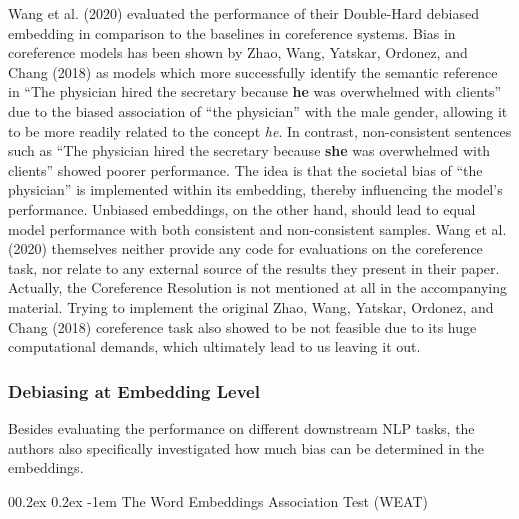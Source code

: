 \documentclass[
  english,
  man,floatsintext]{apa6}
\makeatletter
\let\oldparagraph\paragraph
\renewcommand{\paragraph}[1]{\oldparagraph{#1}\mbox{}}
\renewcommand{\paragraph}{\@startsection{paragraph}{4}{\parindent}%
  {0\baselineskip \@plus 0.2ex \@minus 0.2ex}%
  {-1em}%
  {\normalfont\normalsize\bfseries\itshape\typesectitle}}
\makeatother
\begin{document}
Wang et al. (2020) evaluated the performance of their Double-Hard debiased embedding in comparison to the baselines in coreference systems. Bias in coreference models has been shown by Zhao, Wang, Yatskar, Ordonez, and Chang (2018) as models which more successfully identify the semantic reference in ``The physician hired the secretary because \textbf{he} was overwhelmed with clients'' due to the biased association of ``the physician'' with the male gender, allowing it to be more readily related to the concept \emph{he}. In contrast, non-consistent sentences such as ``The physician hired the secretary because \textbf{she} was overwhelmed with clients'' showed poorer performance. The idea is that the societal bias of ``the physician'' is implemented within its embedding, thereby influencing the model's performance. Unbiased embeddings, on the other hand, should lead to equal model performance with both consistent and non-consistent samples.
Wang et al. (2020) themselves neither provide any code for evaluations on the coreference task, nor relate to any external source of the results they present in their paper. Actually, the Coreference Resolution is not mentioned at all in the accompanying material. Trying to implement the original Zhao, Wang, Yatskar, Ordonez, and Chang (2018) coreference task also showed to be not feasible due to its huge computational demands, which ultimately lead to us leaving it out.

\hypertarget{debiasing-at-embedding-level}{%
\subsubsection{Debiasing at Embedding Level}\label{debiasing-at-embedding-level}}

Besides evaluating the performance on different downstream NLP tasks, the authors also specifically investigated how much bias can be determined in the embeddings.

\hypertarget{the-word-embeddings-association-test-weat}{%
\paragraph{The Word Embeddings Association Test (WEAT)}\label{the-word-embeddings-association-test-weat}}
\end{document}
